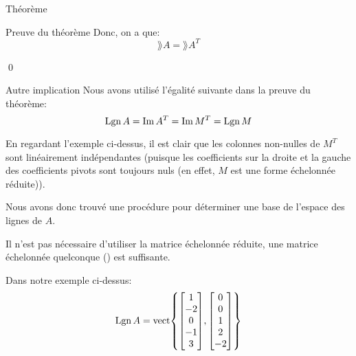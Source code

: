 \documentclass[a4paper]{article}
\begin{document}
\begin{parag}{Théorème}
\begin{subparag}{Preuve du théorème}
        Donc, on a que:
        \[\rang A = \rang A^T\]

        \qed

    \end{subparag}

    \begin{subparag}{Autre implication}
        Nous avons utilisé l'égalité suivante dans la preuve du théorème:
        \[\operatorname{Lgn} A = \operatorname{Im} A^T = \operatorname{Im} M^T = \operatorname{Lgn} M\]

        En regardant l'exemple ci-dessus, il est clair que les colonnes non-nulles de $M^T$ sont linéairement indépendantes (puisque les coefficients sur la droite et la gauche des coefficients pivots sont toujours nuls (en effet, $M$ est une forme échelonnée réduite)).

        Nous avons donc trouvé une procédure pour déterminer une base de l'espace des lignes de $A$.

        Il n'est pas nécessaire d'utiliser la matrice échelonnée réduite, une matrice échelonnée quelconque (\smiley) est suffisante.

        Dans notre exemple ci-dessus:
        \[\lgn A = \vect\left\{\begin{bmatrix} 1 \\ -2 \\ 0 \\ -1 \\ 3 \end{bmatrix}, \begin{bmatrix} 0 \\ 0 \\ 1 \\ 2 \\ -2 \end{bmatrix}  \right\}\]

    \end{subparag}
\end{parag}
\end{document}
